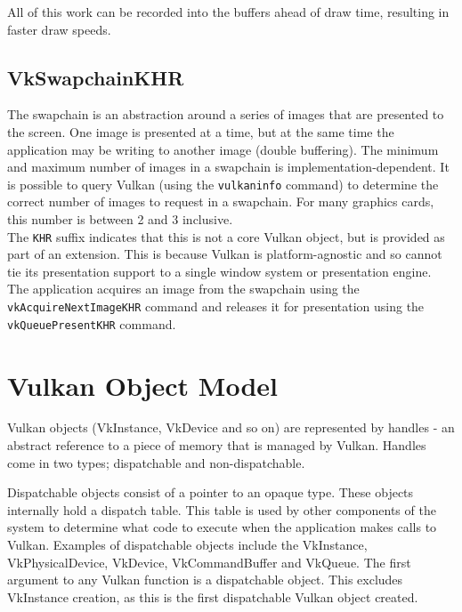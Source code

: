 \documentclass[12pt]{report}
\theoremstyle{definition}
\begin{document}
        All of this work can be recorded into the buffers ahead of draw time,
        resulting in faster draw speeds.

      \subsection{VkSwapchainKHR}

        The swapchain is an abstraction around a series of images that are presented
        to the screen. One image is presented at a time, but at the same time 
        the application may be writing to another image (double buffering). The
        minimum and maximum number of images in a swapchain is implementation-dependent.
        It is possible to query Vulkan (using the \texttt{vulkaninfo} command)
        to determine the correct number of images to request in a swapchain. For
        many graphics cards, this number is between 2 and 3 inclusive. \\

        The \texttt{KHR} suffix indicates that this is not a core Vulkan object,
        but is provided as part of an extension. This is because Vulkan is platform-agnostic
        and so cannot tie its presentation support to a single window system or presentation engine. \\

        The application acquires an image from the swapchain using the \texttt{vkAcquireNextImageKHR} command
        and releases it for presentation using the \texttt{vkQueuePresentKHR} command.

    \section{Vulkan Object Model}

      Vulkan objects (VkInstance, VkDevice and so on) are represented by
      handles - an abstract reference to a piece of memory that is managed by
      Vulkan. Handles come in two types; dispatchable and non-dispatchable.

      Dispatchable objects consist of a pointer to an opaque type. These
      objects internally hold a dispatch table. This table is used by other
      components of the system to determine what code to execute when the
      application makes calls to Vulkan. Examples of dispatchable objects
      include the VkInstance, VkPhysicalDevice, VkDevice, VkCommandBuffer
      and VkQueue. The first argument to any Vulkan function is a
      dispatchable object. This excludes VkInstance creation, as this
      is the first dispatchable Vulkan object created.
\end{document}
